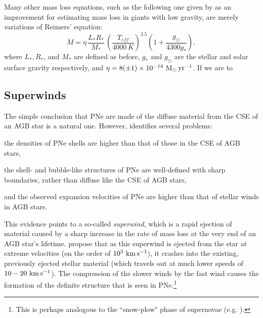 \documentclass[twocolumn]{aastex63}
\begin{document}
Many other mass loss equations, such as the following one given by \cite{schroeder} as an improvement for estimating mass loss in giants with low gravity, are merely variations of Reimers' equation:
\begin{equation*}
    \dot M = \eta\,\frac{L_*R_*}{M_*}\,\left(\frac{T_{eff}}{4000\,K}\right)^{3.5}\left(1+\frac{g_\odot}{4300g_*}\right),
\end{equation*}
where $L_*, R_*$, and $M_*$ are defined as before, $g_*$ and $g_\odot$ are the stellar and solar surface gravity respectively, and $\eta = 8 (\pm 1) \times 10^{-14}~{\rm M_\odot\,yr^{-1}}$. If we are to 

\hfill\vspace{-0.2cm}
\subsection{Superwinds} \label{subsec:superwinds}

The simple conclusion that PNe are made of the diffuse material from the CSE of an AGB star is a natural one. However, \cite{kwok2000} identifies several problems: 
\begin{enumerate*}[label=(\roman*)]
    \item the densities of PNe shells are higher than that of those in the CSE of AGB stars,
    \item the shell- and bubble-like structures of PNe are well-defined with sharp boundaries, rather than diffuse like the CSE of AGB stars, 
    \item and the observed expansion velocities of PNe are higher than that of stellar winds in AGB stars. 
\end{enumerate*}

This evidence points to a so-called \textit{superwind}, which is a rapid ejection of material caused by a sharp increase in the rate of mass loss at the very end of an AGB star's lifetime. \cite{kwok1978} propose that as this superwind is ejected from the star at extreme velocities (on the order of $10^{3}~{\rm km\,s^{-1}}$), it crashes into the existing, previously ejected stellar material (which travels out at much lower speeds of $10-20~{\rm km\,s^{-1}}$). The compression of the slower winds by the fast wind causes the formation of the definite structure that is seen in PNe.\footnote{This is perhaps analogous to the ``snow-plow" phase of supernovae (e.g. \cite{moriya, mccray}).}
\end{document}
